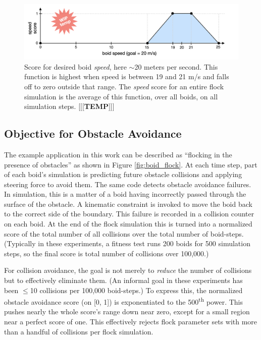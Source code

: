 \documentclass[letterpaper]{article}
\begin{document}
\begin{figure}[t]
    \centering
    \includegraphics[width=0.9\linewidth]{images/temp_speed_score.png}
    \caption{Score for desired boid \textit{speed}, here $\sim$20 meters per second. This function is highest when speed is between 19 and 21 m/s and falls off to zero outside that range. The \textit{speed} score for an entire flock simulation is the average of this function, over all boids, on all simulation steps. [[[\textbf{TEMP}]]]}
    \label{fig:speed_score}
\end{figure}



\subsection{Objective for Obstacle Avoidance}
\label{subsec:avoidance_objective}

The example application in this work can be described as ``flocking in the presence of obstacles'' as shown in Figure \ref{fig:boid_flock}. At each time step, part of each boid's simulation is predicting future obstacle collisions and applying steering force to avoid them. The same code detects obstacle avoidance failures. In simulation, this is a matter of a boid having incorrectly passed through the surface of the obstacle. A kinematic constraint is invoked to move the boid back to the correct side of the boundary. This failure is recorded in a collision counter on each boid. At the end of the flock simulation this is turned into a normalized score of the total number of all collisions over the total number of boid-steps. (Typically in these experiments, a fitness test runs 200 boids for 500 simulation steps, so the final score is total number of collisions over 100,000.) 

For collision avoidance, the goal is not merely to \textit{reduce} the number of collisions but to effectively eliminate them. (An informal goal in these experiments has been {$\leq$}10 collisions per 100,000 boid-steps.) To express this, the normalized obstacle avoidance score (on [0, 1]) is exponentiated to the 500\textsuperscript{th} power. This pushes nearly the whole score's range down near zero, except for a small region near a perfect score of one. This effectively rejects flock parameter sets with more than a handful of collisions per flock simulation.
\end{document}
